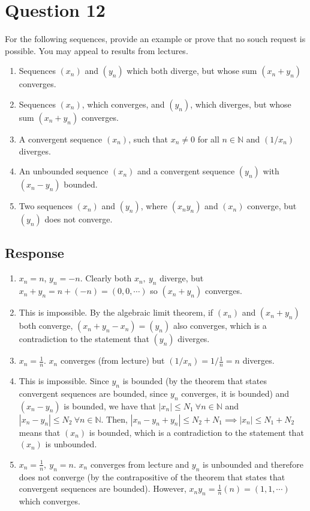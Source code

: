 \documentclass[13pt]{article}
\begin{document}
\newpage
\section*{Question 12}
For the following sequences, provide an example or prove that no souch
request is possible. You may appeal to results from lectures.
\begin{enumerate}[label=(\alph*)]
\item Sequences $(x_n)$ and $(y_n)$ which both diverge, but whose sum
  $(x_n + y_n)$ converges.
\item Sequences $(x_n)$, which converges, and $(y_n)$, which diverges,
  but whose sum $(x_n + y_n)$ converges.
\item A convergent sequence $(x_n)$, such that $x_n \neq 0$ for all $n
  \in \mathbb{N}$ and $(1/x_n)$ diverges.
\item An unbounded sequence $(x_n)$ and a convergent sequence $(y_n)$
  with $(x_n - y_n)$ bounded.
\item Two sequences  $(x_n)$ and $(y_n)$, where $(x_ny_n)$ and
  $(x_n)$ converge, but $(y_n)$ does not converge.
\end{enumerate}

\subsection*{Response}
\begin{enumerate}[label=(\alph*)]
\item $x_n = n$, $y_n = -n$. Clearly both $x_n, \ y_n$ diverge, but
  $x_n + y_n = n + (-n) = (0, 0, \cdots)$ so $(x_n + y_n)$ converges.

\item This is impossible. By the algebraic limit theorem, if $(x_n)$
  and $(x_n + y_n)$ both converge, $(x_n + y_n - x_n) = (y_n)$ also
  converges, which is a contradiction to the statement that $(y_n)$ diverges.

\item $x_n = \frac{1}{n}$. $x_n$ converges (from
  lecture) but $(1/x_n) = 1/\frac{1}{n} = n$ diverges.

\item This is impossible. Since $y_n$ is bounded (by the theorem that
  states convergent sequences are bounded, since $y_n$ converges, it
  is bounded) and $(x_n - y_n)$ is bounded, we have that $|x_n| \leq
  N_1 \ \forall n \in \mathbb{N}$ and $|x_n - y_n| \leq N_2 \ \forall n \in
  \mathbb{N}$. Then, $|x_n - y_n + y_n| \leq N_2 + N_1 \implies |x_n|
  \leq N_1 + N_2$ means that $(x_n)$ is bounded, which is a
  contradiction to the statement that $(x_n)$ is unbounded. 
  
\item $x_n = \frac{1}{n}, \ y_n = n$. $x_n$ converges from lecture and
  $y_n$ is unbounded and therefore does not converge (by the
  contrapositive of the theorem that states that convergent sequences
  are bounded). However, $x_ny_n = \frac{1}{n}(n) = (1, 1, \cdots)$
  which converges. 
\end{enumerate}
\end{document}
